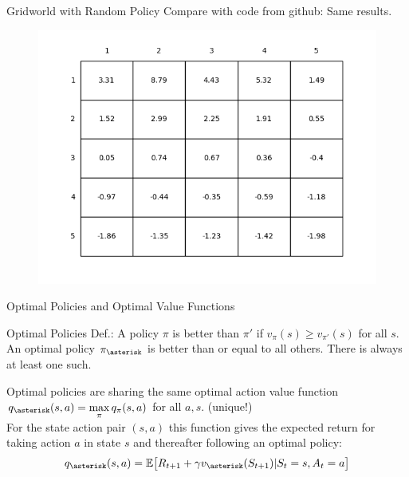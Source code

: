 \documentclass{beamer}
\begin{document}
\begin{frame}{Gridworld with Random Policy}
	Compare with code from github: Same results.
	\begin{figure}
	\centering
	\includegraphics[width=0.8\linewidth]{Images/figure_3_2.png}\\	
	\end{figure}
\end{frame}

\begin{frame}{Optimal Policies and Optimal Value Functions}	

\begin{alertblock}{Optimal Policies}
Def.: A policy $\pi$ is better than $\pi'$ if $v_{\pi} (s) \ge v_{\pi'} (s)$ for all $s$. 
An optimal policy $\pi_{\asterisk}$ is better than or equal to all others. There is always at least one such. 
\end{alertblock}
Optimal policies are sharing the same optimal action value function $q_{\asterisk}(s,a) = \max\limits_{\pi} q_{\pi} (s,a)$ for all $a,s$. (unique!)\\
For the state action pair $(s,a)$ this function gives the expected return for taking action $a$ in state $s$ and thereafter following an optimal policy:
\begin{equation*}
q_{\asterisk}(s,a) = \mathbb{E} \big[ R_{t+1} + \gamma v_{\asterisk}(S_{t+1}) | S_t=s, A_t = a \big]
\end{equation*}
\end{frame}
\end{document}
